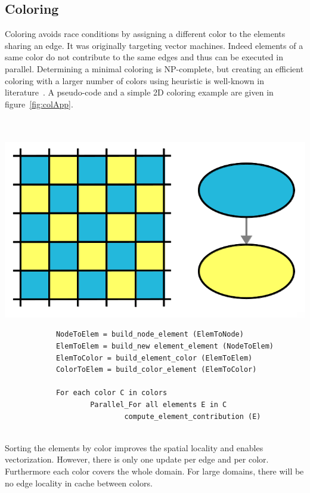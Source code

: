 \documentclass{IOS-Book-Article}
\begin{document}
\subsection{Coloring}
\label{sec:col}
Coloring avoids race conditions by assigning a different color to the elements sharing an edge.
It was originally targeting vector machines. Indeed elements of a same color do not contribute to the same edges and thus can be executed in parallel.
Determining a minimal coloring is NP-complete, but creating an efficient coloring with a larger number of colors using heuristic is well-known in literature~\cite{CPUfe}.
A pseudo-code and a simple 2D coloring example are given in figure~\ref{fig:colApp}.
~\\~\\~\\
{
\begin{minipage}[tp]{0.34\textwidth}
	\includegraphics[scale=0.15]{Coloring_approach.png}
\end{minipage}
\begin{minipage}[tp]{0.55\textwidth}
 		\small
 		\begin{verbatim}
			NodeToElem = build_node_element (ElemToNode)
			ElemToElem = build_new element_element (NodeToElem)
			ElemToColor = build_element_color (ElemToElem)
			ColorToElem = build_color_element (ElemToColor)

			For each color C in colors
    				Parallel_For all elements E in C
        					compute_element_contribution (E)
 		\end{verbatim}
 \end{minipage}	
 }
 ~\\
Sorting the elements by color improves the spatial locality and enables vectorization.
However, there is only one update per edge and per color. Furthermore each color covers the whole domain.
For large domains, there will be no edge locality in cache between colors.
\end{document}
